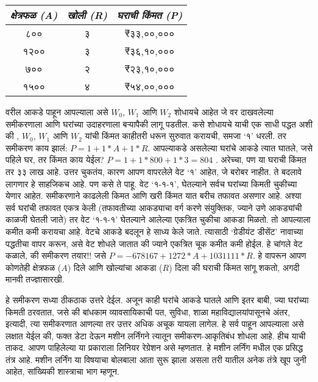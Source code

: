 \begin{table}[h!]
\centering
\begin{tabular}{|c|c|c|}
\hline
\textit{क्षेत्रफळ (A)} & \textit{खोली (R)} & \textit{घराची किंमत (P)} \\
\hline
८०० & ३ & ₹३३,००,००० \\
१२०० & ३ & ₹३६,१०,००० \\
७०० & २ & ₹२३,१०,००० \\
१५०० & ४ & ₹५४,००,००० \\
\hline
\end{tabular}
\end{table}


वरील आकडे पाहून आपल्याला असे $W_0$, $W_1$ आणि $W_2$ शोधायचे आहेत जे वर दाखवलेल्या समीकरणाला आणि घरांच्या उदाहरणाला बऱ्यापैकी लागू पडतील. कसे शोधायचे याची एक साधी पद्धत अशी की , $W_0$, $W_1$ आणि $W_2$ यांची किंमत काहीतरी धरून सुरुवात करायची, समजा `१' धरली. तर समीकरण काय झालं: $P = 1+ 1 *A + 1 *R$. आपल्याकडे असलेल्या घरांचे आकडे त्यात घातले, जसे पहिले घर, तर किंमत काय येईल? $P = 1+ 1 * 800 + 1*3 = 804$ . अरेच्चा, पण या घराची किंमत तर ३३ लाख आहे. उत्तर चुकतंय, कारण आपण वापरलेले वेट `१' आहेत, जे बरोबर नाहीत. ते बदलावे लागणार हे साहजिकच आहे. पण कसे ते पाहू. वेट `१-१-१', घेतल्याने सर्वच घरांच्या किमती चुकीच्या येणार आहेत. समीकरणाने काढलेली किमत आणि खरी किंमत यात बरीच तफावत असणार आहे. अश्या सर्व घरांची तफावत एकत्र केली (तफावतीच्या आकड्याचा वर्ग करणे संयुक्तिक, ज्याने उणे आकड्यांची काळजी घेतली जाते) तर वेट `१-१-१' घेतल्याने आलेल्या एकत्रित चुकीचा आकडा मिळतो. तो आपल्याला कमीत कमी करायचा आहे. वेटचे आकडे बदलून हे साध्य केले जाते. त्यासाठी `ग्रेडीयंट डीसेंट' नावाच्या पद्धतीचा वापर करून, असे वेट शोधले जातात की ज्याने एकत्रित चूक कमीत कमी होईल. हे चांगले वेट कळाले, की समीकरण तयार!! जसे $P = -678167 + 1272 * A + 1031111 * R$. हे वापरून आपण कोणतेही क्षेत्रफळ ($A$) दिले आणि खोल्यांचा आकडा ($R$) दिला की  घराची किंमत सांगू शकतो, अगदी मानवी तज्ज्ञासारखी.

हे समीकरण सध्या ठीकठाक उत्तरे देईल. अजून काही घरांचे आकडे  घातले  आणि इतर बाबी, ज्या घरांच्या किमती ठरवतात, जसे की बांधकाम व्यावसायिकाची पत, सुविधा, शाळा महाविद्यालयांपासूनचे अंतर, इत्यादी, त्या समीकरणात आणल्या तर उत्तर अधिक अचूक यायला लागेल. हे सर्व पाहून आपल्याला असे लक्षात येईल की, फक्त डेटा देऊन मशीन लर्निंगने त्यातून समीकरण-आकृतिबंध शोधला आहे. हीच याची ताकद. आपण पाहिलेल्या या प्रकाराला लिनियर रेग्रेशन असे म्हणतात. हे मशीन लर्निंग मधील एक प्रसिद्ध तंत्र आहे. मशीन लर्निंग या विषयाचा बोलबाला आता सुरू झाला असला तरी यातील अनेक तंत्रे खूप जुनी आहेत, सांख्यिकी शास्त्राचा भाग म्हणून.

